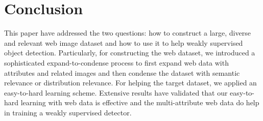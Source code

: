 \documentclass[10pt,twocolumn,letterpaper]{article}
\begin{document}
\section {Conclusion}
\label{conclusion}
This paper have addressed the two questions: how to construct a large, diverse and relevant web image dataset and how to use it to help weakly supervised object detection. Particularly, for constructing the web dataset, we introduced a sophisticated expand-to-condense process to first expand web data with attributes and related images and then condense the dataset with semantic relevance or distribution relevance. For helping the target dataset, we applied an easy-to-hard learning scheme. Extensive results have validated that our easy-to-hard learning with web data is effective and the multi-attribute web data do help in training a weakly supervised detector.






\clearpage
{\small


}
\end{document}
